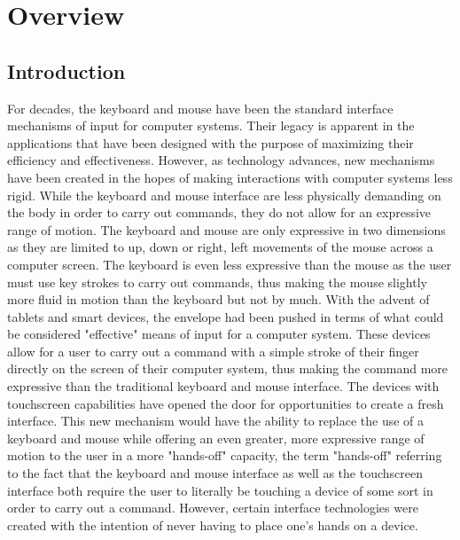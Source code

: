 
\chapter{Overview} %

\label{Chapter1} %


\section{Introduction}
For decades, the keyboard and mouse have been the standard interface mechanisms of input for computer systems. Their legacy is apparent in the applications that have been designed with the purpose of maximizing their efficiency and effectiveness. However, as technology advances, new mechanisms have been created in the hopes of making interactions with computer systems less rigid. While the keyboard and mouse interface are less physically demanding on the body in order to carry out commands, they do not allow for an expressive range of motion. The keyboard and mouse are only expressive in two dimensions as they are limited to up, down or right, left movements of the mouse across a computer screen. The keyboard is even less expressive than the mouse as the user must use key strokes to carry out commands, thus making the mouse slightly more fluid in motion than the keyboard but not by much. With the advent of tablets and smart devices, the envelope had been pushed in terms of what could be considered "effective" means of input for a computer system. These devices allow for a user to carry out a command with a simple stroke of their finger directly on the screen of their computer system, thus making the command more expressive than the traditional keyboard and mouse interface. The devices with touchscreen capabilities have opened the door for opportunities to create a fresh interface. This new mechanism would have the ability to replace the use of a keyboard and mouse while offering an even greater, more expressive range of motion to the user in a more "hands-off" capacity, the term "hands-off" referring to the fact that the keyboard and mouse interface as well as the touchscreen interface both require the user to literally be touching a device of some sort in order to carry out a command. However, certain interface technologies were created with the intention of never having to place one's hands on a device.

